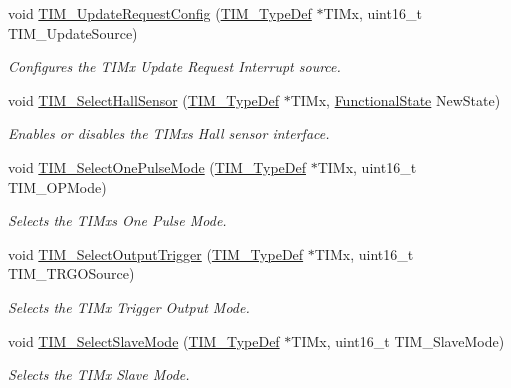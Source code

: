 \begin{DoxyCompactItemize}
void \mbox{\hyperlink{group___t_i_m___private___functions_ga1d7a8f952e209de142499e67a653fc1f}{T\+I\+M\+\_\+\+Update\+Request\+Config}} (\mbox{\hyperlink{struct_t_i_m___type_def}{T\+I\+M\+\_\+\+Type\+Def}} $\ast$T\+I\+Mx, uint16\+\_\+t T\+I\+M\+\_\+\+Update\+Source)
\begin{DoxyCompactList}\small\item\em Configures the T\+I\+Mx Update Request Interrupt source. \end{DoxyCompactList}\item 
void \mbox{\hyperlink{group___t_i_m___private___functions_ga42c2d1025a3937c9d9f38631af86ffa4}{T\+I\+M\+\_\+\+Select\+Hall\+Sensor}} (\mbox{\hyperlink{struct_t_i_m___type_def}{T\+I\+M\+\_\+\+Type\+Def}} $\ast$T\+I\+Mx, \mbox{\hyperlink{group___exported__types_gac9a7e9a35d2513ec15c3b537aaa4fba1}{Functional\+State}} New\+State)
\begin{DoxyCompactList}\small\item\em Enables or disables the T\+I\+Mx\textquotesingle{}s Hall sensor interface. \end{DoxyCompactList}\item 
void \mbox{\hyperlink{group___t_i_m___private___functions_gadd2cca5fac6c1291dc4339098d5c9562}{T\+I\+M\+\_\+\+Select\+One\+Pulse\+Mode}} (\mbox{\hyperlink{struct_t_i_m___type_def}{T\+I\+M\+\_\+\+Type\+Def}} $\ast$T\+I\+Mx, uint16\+\_\+t T\+I\+M\+\_\+\+O\+P\+Mode)
\begin{DoxyCompactList}\small\item\em Selects the T\+I\+Mx\textquotesingle{}s One Pulse Mode. \end{DoxyCompactList}\item 
void \mbox{\hyperlink{group___t_i_m___private___functions_ga28745aaa549e2067e42c19569209e6c6}{T\+I\+M\+\_\+\+Select\+Output\+Trigger}} (\mbox{\hyperlink{struct_t_i_m___type_def}{T\+I\+M\+\_\+\+Type\+Def}} $\ast$T\+I\+Mx, uint16\+\_\+t T\+I\+M\+\_\+\+T\+R\+G\+O\+Source)
\begin{DoxyCompactList}\small\item\em Selects the T\+I\+Mx Trigger Output Mode. \end{DoxyCompactList}\item 
void \mbox{\hyperlink{group___t_i_m___private___functions_ga2f19ce1d90990691cf037e419ba08003}{T\+I\+M\+\_\+\+Select\+Slave\+Mode}} (\mbox{\hyperlink{struct_t_i_m___type_def}{T\+I\+M\+\_\+\+Type\+Def}} $\ast$T\+I\+Mx, uint16\+\_\+t T\+I\+M\+\_\+\+Slave\+Mode)
\begin{DoxyCompactList}\small\item\em Selects the T\+I\+Mx Slave Mode. \end{DoxyCompactList}\item 

\end{DoxyCompactItemize}
